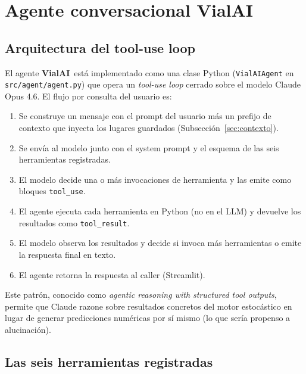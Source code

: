 \documentclass[11pt,a4paper]{article}
\newcommand{\VialAI}{\textbf{\textcolor{vialTeal}{Vial}\textcolor{vialAmber}{AI}}}
\begin{document}
\section{Agente conversacional VialAI}
\label{sec:agente}

\subsection{Arquitectura del tool-use loop}

El agente \VialAI\ está implementado como una clase Python
(\texttt{VialAIAgent} en \texttt{src/agent/agent.py}) que opera
un \emph{tool-use loop} cerrado sobre el modelo Claude Opus 4.6.
El flujo por consulta del usuario es:

\begin{enumerate}
\item Se construye un mensaje con el prompt del usuario más un
prefijo de contexto que inyecta los lugares guardados
(Subsección~\ref{sec:contexto}).
\item Se envía al modelo junto con el system prompt y el esquema
de las seis herramientas registradas.
\item El modelo decide una o más invocaciones de herramienta y
las emite como bloques \texttt{tool\_use}.
\item El agente ejecuta cada herramienta en Python (no en el LLM)
y devuelve los resultados como \texttt{tool\_result}.
\item El modelo observa los resultados y decide si invoca más
herramientas o emite la respuesta final en texto.
\item El agente retorna la respuesta al caller (Streamlit).
\end{enumerate}

Este patrón, conocido como \emph{agentic reasoning with
structured tool outputs}, permite que Claude razone sobre
resultados concretos del motor estocástico en lugar de generar
predicciones numéricas por sí mismo (lo que sería propenso a
alucinación).

\subsection{Las seis herramientas registradas}
\end{document}
